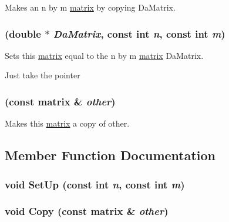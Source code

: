 Makes an n by m \hyperlink{classJKBuilder_1_1matrix}{matrix} by copying DaMatrix. \hypertarget{classJKBuilder_1_1matrix_a752ebd9a51439abd10e09ff48df7e180}{
\subsubsection[{matrix}]{ (double $\ast$ {\em DaMatrix}, \/  const int {\em n}, \/  const int {\em m})}}
\label{classJKBuilder_1_1matrix_a752ebd9a51439abd10e09ff48df7e180}


Sets this \hyperlink{classJKBuilder_1_1matrix}{matrix} equal to the n by m \hyperlink{classJKBuilder_1_1matrix}{matrix} DaMatrix. 

Just take the pointer \hypertarget{classJKBuilder_1_1matrix_aff55091606b5db4c54b83a04033182d7}{
\subsubsection[{matrix}]{ (const {\bf matrix} \& {\em other})}}
\label{classJKBuilder_1_1matrix_aff55091606b5db4c54b83a04033182d7}


Makes this \hyperlink{classJKBuilder_1_1matrix}{matrix} a copy of other. 

\subsection{Member Function Documentation}
\hypertarget{classJKBuilder_1_1matrix_a065caae828723eb0040120cb077780c5}{
\subsubsection[{SetUp}]{\setlength{\rightskip}{0pt plus 5cm}void SetUp (const int {\em n}, \/  const int {\em m})}}
\label{classJKBuilder_1_1matrix_a065caae828723eb0040120cb077780c5}
\hypertarget{classJKBuilder_1_1matrix_a75177328107f96ec679d43fce0a9e866}{
\subsubsection[{Copy}]{\setlength{\rightskip}{0pt plus 5cm}void Copy (const {\bf matrix} \& {\em other})}}
\label{classJKBuilder_1_1matrix_a75177328107f96ec679d43fce0a9e866}


